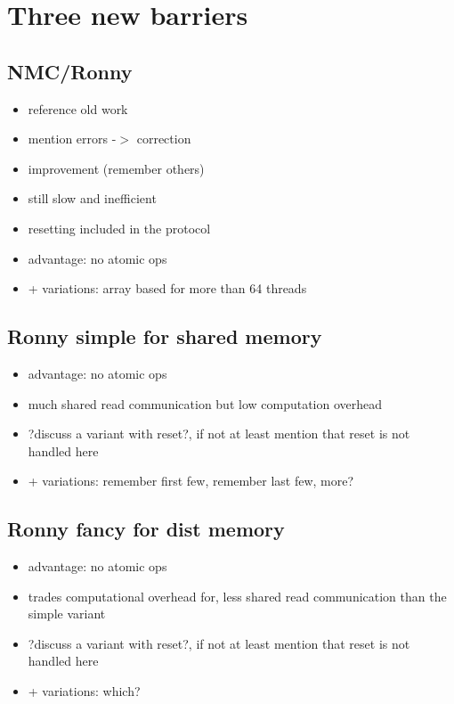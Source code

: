 \documentclass[a4paper, 10pt]{article}
\begin{document}
\section{Three new barriers}
\subsection{NMC/Ronny}
\begin{itemize}
	\item reference old work
	\item mention errors -$>$ correction
	\item improvement (remember others)
	\item still slow and inefficient
	\item resetting included in the protocol
	\item advantage: no atomic ops
	\item + variations: array based for more than 64 threads
\end{itemize}

\subsection{Ronny simple for shared memory}
\begin{itemize}
	\item advantage: no atomic ops
	\item much shared read communication but low computation overhead
	\item ?discuss a variant with reset?, if not at least mention that reset is not handled here
	\item + variations: remember first few, remember last few, more?
\end{itemize}

\subsection{Ronny fancy for dist memory}
\begin{itemize}
	\item advantage: no atomic ops
	\item trades computational overhead for, less shared read communication than the simple variant
	\item ?discuss a variant with reset?, if not at least mention that reset is not handled here
	\item + variations: which?
\end{itemize}
\end{document}
